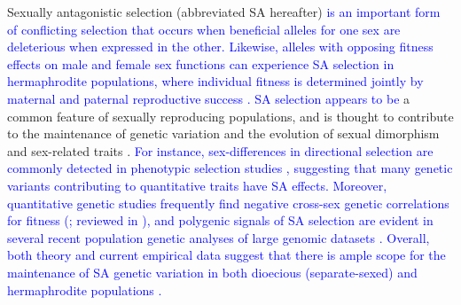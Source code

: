 \documentclass[11pt]{article}
\begin{document}
Sexually antagonistic selection (abbreviated SA hereafter) \textcolor{blue}{is an important form of conflicting selection that occurs when beneficial alleles for one sex are deleterious when expressed in the other. Likewise, alleles with opposing fitness effects on male and female sex functions can experience SA selection in hermaphrodite populations, where individual fitness is determined jointly by maternal and paternal reproductive success \citep{LloydWebb1986, WebbLloyd1986, Abbott2011, JordanConnallon2014}. SA selection appears to be} a common feature of sexually reproducing populations, and is thought to contribute to the maintenance of genetic variation and the evolution of sexual dimorphism and sex-related traits \citep{Kidwell1977, Lande1980, Rice1992, Charlesworth1999, RiceChippindale2001, ConnallonClark2012, BondurianskyChenoweth2009, Olito2019}. \textcolor{blue}{For instance, sex-differences in directional selection are commonly detected in phenotypic selection studies \citep[e.g.,][]{DeLisle-etal-2018,Lewis-etal-2011,CoxCalsbeek2009,SinghPunzalan2018}, suggesting that many genetic variants contributing to quantitative traits have SA effects. Moreover, quantitative genetic studies frequently find negative cross-sex genetic correlations for fitness (\citealt{Chippendale-etal-2001,Delph-etal-2011}; reviewed in \citealt{ConnallonMatthews2019}), and polygenic signals of SA selection are evident in several recent population genetic analyses of large genomic datasets \citep{RuzickaESEB2020, RuzickaConnallon2022}. Overall, both theory and current empirical data suggest that there is ample scope for the maintenance of SA \textcolor{blue}{genetic variation} in both dioecious \textcolor{blue}{(separate-sexed)} and hermaphrodite populations \citep{BondurianskyChenoweth2009, Abbott2011, RuzickaESEB2020, WangBarrett2020}.}

\end{document}
